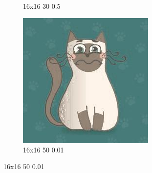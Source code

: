\documentclass[12pt,a4paper]{article}
\begin{document}
\begin{figure}[htb]
\begin{subfigure}{0.25\textwidth}
  \caption{16x16 30 0.5}
  \label{fig:4}
\end{subfigure}\hfil %
\begin{subfigure}{0.25\textwidth}
  \includegraphics[width=\linewidth]{images/cartoon/16-16-50-001}
  \caption{16x16 50 0.01}
  \label{fig:5}
\end{subfigure}\hfil %


\end{figure}
\end{document}
